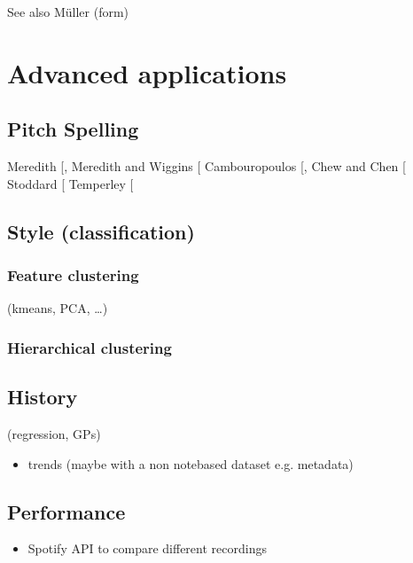 \documentclass[letterpaper,10pt,english]{sphinxmanual}
\begin{document}
See also Müller (form)


\chapter{Advanced applications}
\label{\detokenize{6_advanced:advanced-applications}}\label{\detokenize{6_advanced::doc}}

\section{Pitch Spelling}
\label{\detokenize{6_advanced:pitch-spelling}}\label{\detokenize{6_advanced:id1}}
Meredith {[}\sphinxcite{8_bibliography:id9}{]}, Meredith and Wiggins {[}\sphinxcite{8_bibliography:id8}{]}
Cambouropoulos {[}\sphinxcite{8_bibliography:id10}{]}, Chew and Chen {[}\sphinxcite{8_bibliography:id11}{]}
Stoddard  {[}\sphinxcite{8_bibliography:id12}{]}
Temperley {[}\sphinxcite{8_bibliography:id13}{]}


\section{Style (classification)}
\label{\detokenize{6_advanced:style-classification}}

\subsection{Feature clustering}
\label{\detokenize{6_advanced:feature-clustering}}
(k\sphinxhyphen{}means, PCA, …)


\subsection{Hierarchical clustering}
\label{\detokenize{6_advanced:hierarchical-clustering}}

\section{History}
\label{\detokenize{6_advanced:history}}
(regression, GPs)
\begin{itemize}
\item {} 
trends (maybe with a non note\sphinxhyphen{}based dataset e.g. metadata)

\end{itemize}


\section{Performance}
\label{\detokenize{6_advanced:performance}}\begin{itemize}
\item {} 
Spotify API to compare different recordings

\end{itemize}
\end{document}
